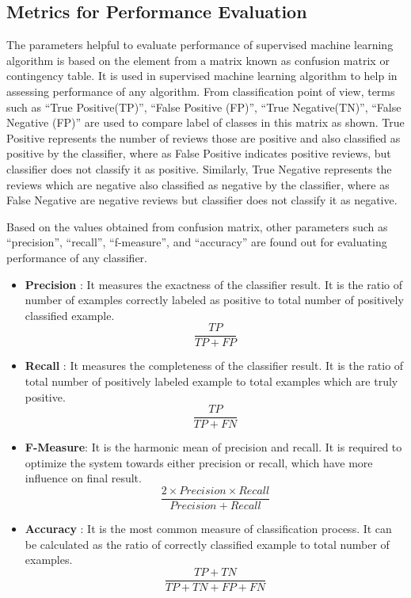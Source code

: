 \documentclass[oneside,a4paper,12pt]{pictreport}
\begin{document}
\subsection{Metrics for Performance Evaluation}
The parameters helpful to evaluate performance of supervised
machine learning algorithm is based on the element from a matrix 
known as confusion matrix or contingency table. It is used
in supervised machine learning algorithm to help in assessing
performance of any algorithm. From classification point of view,
terms such as ``True Positive(TP)'', ``False Positive (FP)'', ``True 
Negative(TN)'', ``False Negative (FP)'' are used to compare label of classes
in this matrix as shown. True Positive represents the number of reviews those are
positive and also classified as positive by the classifier, where as
False Positive indicates positive reviews, but classifier does not
classify it as positive. Similarly, True Negative represents 
the reviews which are negative also classified as negative by the 
classifier, where as False Negative are negative reviews but classifier
does not classify it as negative.

\par Based on the values obtained from confusion matrix, other 
parameters such as ``precision'', ``recall'', ``f-measure'', and ``accuracy''
are found out for evaluating performance of any classifier.


\begin{itemize}
\item \textbf{Precision} : It measures the exactness of the classifier result. It is
the ratio of number of examples correctly labeled as positive to
total number of positively classified example.
\begin{equation}
\frac{TP}{TP + FP}
\end{equation}
\item \textbf{Recall} : It measures the completeness of the classifier result. It is
the ratio of total number of positively labeled example to total
examples which are truly positive.
\begin{equation}
\frac{TP}{TP + FN}
\end{equation}
\item \textbf{F-Measure}: It is the harmonic mean of precision and recall. It
is required to optimize the system towards either precision or recall, which 
have more influence on final result.
\begin{equation}
\frac{2 \times Precision \times Recall}{Precision + Recall}
\end{equation}
\item \textbf{Accuracy} : It is the most common measure of classification 
process. It can be calculated as the ratio of correctly classified 
example to total number of examples. 
\begin{equation}
\frac{TP + TN}{TP + TN + FP + FN}
\end{equation}
\end{itemize}
\end{document}
